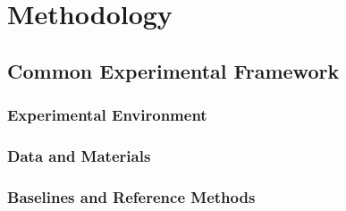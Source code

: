 %
%

\section{Methodology}
\label{sec:methodology}


\subsection{Common Experimental Framework}
\label{sec:method-common}

\subsubsection{Experimental Environment}
\label{sec:method-environment}

\subsubsection{Data and Materials}
\label{sec:method-data}

\subsubsection{Baselines and Reference Methods}
\label{sec:method-baselines}

